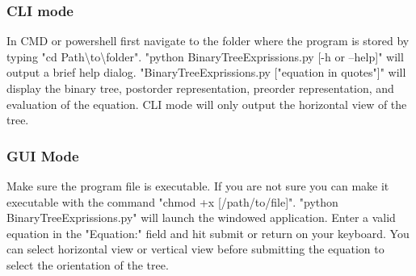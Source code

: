 \documentclass[10pt]{article}
\begin{document}
\subsubsection{CLI mode}
In CMD or powershell first navigate to the folder where the program is stored by typing "cd Path\textbackslash{}to\textbackslash{}folder". "python BinaryTreeExprissions.py [-h or --help]"  will output a brief help dialog. "BinaryTreeExprissions.py ["equation in quotes"]" will display the binary tree, postorder representation, preorder representation, and evaluation of the equation. CLI mode will only output the horizontal view of the tree.
\subsubsection{GUI Mode}
Make sure the program file is executable. If you are not sure you can make it executable with the command "chmod +x [/path/to/file]". "python BinaryTreeExprissions.py" will launch the windowed application. Enter a valid equation in the "Equation:" field and hit submit or return on your keyboard. You can select horizontal view or vertical view before submitting the equation to select the orientation of the tree.
\end{document}
